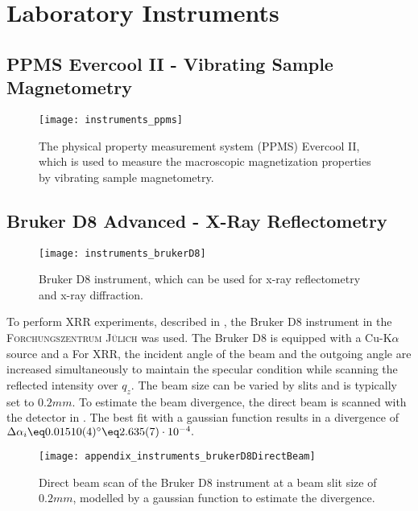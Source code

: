 \documentclass[\main/dresen_thesis.tex]{subfiles}
\begin{document}
\chapter{Laboratory Instruments}
\section{PPMS Evercool II - Vibrating Sample Magnetometry}
\label{app:additionalExperimentalTechniques:vsm}
\begin{figure}[h]
  \centering
  \texttt{[image: instruments\_ppms]}
  \caption{\label{fig:appendix:instruments:ppms}The physical property measurement system (PPMS) Evercool II, which is used to measure the macroscopic magnetization properties by vibrating sample magnetometry.}
\end{figure}

\section{Bruker D8 Advanced - X-Ray Reflectometry}
\label{app:additionalExperimentalTechniques:xrr}
\begin{figure}[h]
  \centering
  \texttt{[image: instruments\_brukerD8]}
  \caption{\label{fig:appendix:instruments:brukerD8}Bruker D8 instrument, which can be used for x-ray reflectometry and x-ray diffraction.}
\end{figure}
To perform XRR experiments, described in , the Bruker D8 instrument in the \textsc{Forchungszentrum J\"ulich} was used.
The Bruker D8 is equipped with a Cu-K$\alpha$ source and a 
For XRR, the incident angle of the beam and the outgoing angle are increased simultaneously to maintain the specular condition while scanning the reflected intensity over $q_z$.
The beam size can be varied by slits and is typically set to $0.2 \unit{mm}$.
To estimate the beam divergence, the direct beam is scanned with the detector in .
The best fit with a gaussian function results in a divergence of $\Delta \alpha_i \eq 0.01510(4) ^\circ \eq 2.635(7) \cdot 10^{-4}.$
\begin{figure}[h]
  \centering
  \texttt{[image: appendix\_instruments\_brukerD8DirectBeam]}
  \caption{\label{fig:appendix:instruments:brukerD8DirectBeam}Direct beam scan of the Bruker D8 instrument at a beam slit size of $0.2 \unit{mm}$, modelled by a gaussian function to estimate the divergence.}
\end{figure}
\end{document}

